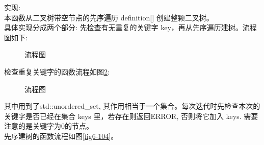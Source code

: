 \documentclass[supercite]{Experimental_Report}
\theoremstyle{definition}
\begin{document}
\noindent
实现: \\
本函数从二叉树带空节点的先序遍历 definition[] 创建整颗二叉树。 \\
具体实现分成两个部分: 先检查有无重复的关键字 key，再从先序遍历建树。流程图如下:
\begin{figure}[H]
	\centering
	\centering
	\caption{流程图}
	\label{fig6-105}
\end{figure}
\noindent
检查重复关键字的函数流程如图\ref{fig6-106}:
\begin{figure}[H]
	\centering
	\centering
	\caption{流程图}
	\label{fig6-106}
\end{figure}
\noindent
其中用到了std::unordered\_set, 其作用相当于一个集合。每次迭代时先检查本次的关键字是否已经在集合 keys 里，若存在则返回ERROR, 否则将它加入 keys. 需要注意的是关键字为0的节点。 \\
先序建树的函数流程如图\ref{fig6-104}。 \\
\end{document}
